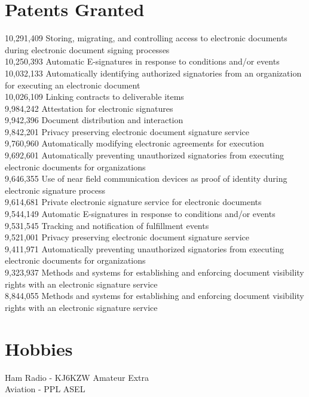 \documentclass{res}
\begin{document}
        \section{Patents Granted}
        10,291,409      Storing, migrating, and controlling access to electronic documents during electronic document signing processes \\
        10,250,393      Automatic E-signatures in response to conditions and/or events \\
        10,032,133 	Automatically identifying authorized signatories from an organization for executing an electronic document \\
        10,026,109	Linking contracts to deliverable items \\
        9,984,242	Attestation for electronic signatures \\
        9,942,396	Document distribution and interaction \\
        9,842,201	Privacy preserving electronic document signature service \\
        9,760,960	Automatically modifying electronic agreements for execution \\
        9,692,601	Automatically preventing unauthorized signatories from executing electronic documents for organizations \\
        9,646,355	Use of near field communication devices as proof of identity during electronic signature process \\
        9,614,681	Private electronic signature service for electronic documents \\
        9,544,149	Automatic E-signatures in response to conditions and/or events \\ 
        9,531,545	Tracking and notification of fulfillment events \\
        9,521,001	Privacy preserving electronic document signature service \\
        9,411,971	Automatically preventing unauthorized signatories from executing electronic documents for organizations \\
        9,323,937	Methods and systems for establishing and enforcing document visibility rights with an electronic signature service \\
        8,844,055	Methods and systems for establishing and enforcing document visibility rights with an electronic signature service \\
        
\section{Hobbies}
Ham Radio - KJ6KZW Amateur Extra \\
Aviation - PPL ASEL \\
\end{document}
